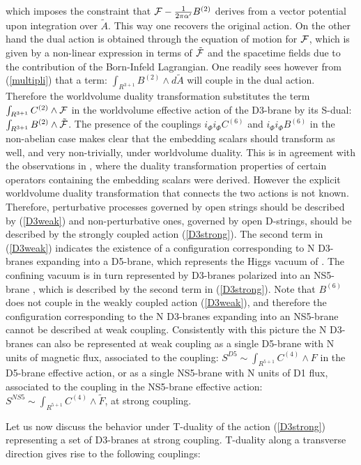 \documentclass[12pt,a4paper]{article}
\begin{document}
\noindent which imposes the constraint that 
${\cal F}-\frac{1}{2\pi\alpha^\prime}B^{(2)}$ 
derives from
a vector potential upon integration over
${\tilde A}$. This way one recovers the original action. On
the other hand the dual action is obtained through the equation
of motion for ${\cal F}$, which is given by a non-linear expression 
in terms of ${\tilde {\cal F}}$ and the spacetime fields 
due to the contribution of the Born-Infeld Lagrangian.
One readily sees however from (\ref{multipli}) that a term: 
$\int_{R^{3+1}}B^{(2)}\wedge d{\tilde A}$ will
couple in the dual action. Therefore the worldvolume duality
transformation substitutes the term 
$\int_{R^{3+1}}C^{(2)}\wedge {\cal F}$ in the worldvolume
effective action of the D3-brane by its S-dual:
$\int_{R^{3+1}}B^{(2)}\wedge {\tilde {\cal F}}$. 
The presence of the couplings $i_\Phi i_\Phi C^{(6)}$ and
$i_\Phi i_\Phi B^{(6)}$ in the non-abelian case makes clear
that the embedding scalars should transform as well, and very
non-trivially, under worldvolume duality. 
This is in agreement with the observations in \cite{TvR},
where the duality transformation properties of certain operators
containing the embedding scalars were derived.
However the explicit worldvolume duality transformation that connects
the two actions is not known.
Therefore, perturbative processes governed by open strings should be
described by (\ref{D3weak}) and non-perturbative ones, governed by
open D-strings, should be described by the strongly coupled action
(\ref{D3strong}). The second term in (\ref{D3weak}) indicates the
existence of a configuration corresponding to N D3-branes expanding
into a D5-brane, which represents the Higgs vacuum of \cite{PS}.
The confining vacuum is in turn represented by D3-branes polarized
into an NS5-brane \cite{PS}, which is described by the second term
in (\ref{D3strong}). Note that $B^{(6)}$ does not couple in the
weakly coupled action (\ref{D3weak}), and therefore the configuration
corresponding to the N D3-branes expanding into an NS5-brane cannot
be described at weak coupling. Consistently with this picture the
N D3-branes can also be represented at weak coupling as a single D5-brane
with N units of magnetic flux, associated to the coupling:
$S^{D5}\sim\int_{R^{5+1}} C^{(4)}\wedge F$ in the D5-brane effective action,
or as a single NS5-brane with N units of D1 flux, associated to the
coupling in the NS5-brane effective action:
$S^{NS5}\sim \int_{R^{5+1}}C^{(4)}\wedge {\tilde F}$, at strong coupling.


Let us now discuss the behavior under T-duality
of the action (\ref{D3strong}) representing
a set of D3-branes at strong coupling.
T-duality along a transverse direction
gives rise to the following couplings:
\end{document}
